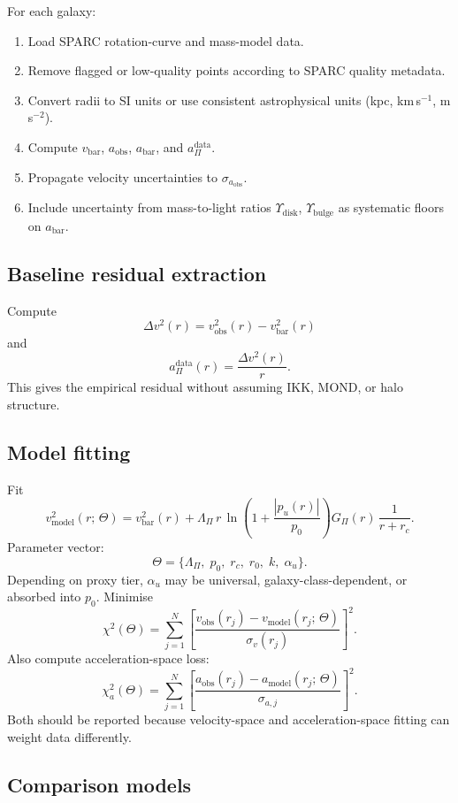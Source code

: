 \documentclass[11pt,a4paper,oneside]{article}
\newcommand{\aobs}{a_{\mathrm{obs}}}
\newcommand{\abar}{a_{\mathrm{bar}}}
\newcommand{\aPi}{a_{\Pi}}
\newcommand{\vobs}{v_{\mathrm{obs}}}
\newcommand{\vbar}{v_{\mathrm{bar}}}
\newcommand{\vmod}{v_{\mathrm{model}}}
\newcommand{\LamPi}{\Lambda_{\Pi}}
\newcommand{\pzero}{p_0}
\newcommand{\rc}{r_c}
\newcommand{\rzero}{r_0}
\newcommand{\pu}{p_u}
\newcommand{\GPi}{G_{\Pi}}
\newcommand{\Upsdisk}{\Upsilon_{\mathrm{disk}}}
\newcommand{\Upsbulge}{\Upsilon_{\mathrm{bulge}}}
\begin{document}
For each galaxy:
\begin{enumerate}
  \item Load SPARC rotation-curve and mass-model data.
  \item Remove flagged or low-quality points according to SPARC quality metadata.
  \item Convert radii to SI units or use consistent astrophysical units
        (kpc, km\,s$^{-1}$, m\,s$^{-2}$).
  \item Compute $\vbar$, $\aobs$, $\abar$, and $\aPi^{\mathrm{data}}$.
  \item Propagate velocity uncertainties to $\sigma_{\aobs}$.
  \item Include uncertainty from mass-to-light ratios $\Upsdisk$, $\Upsbulge$ as
        systematic floors on $\abar$.
\end{enumerate}

\subsection{Baseline residual extraction}

Compute
\[
    \Delta v^2(r) = \vobs^2(r) - \vbar^2(r)
\]
and
\[
    \aPi^{\mathrm{data}}(r) = \frac{\Delta v^2(r)}{r}.
\]
This gives the empirical residual without assuming IKK, MOND, or halo structure.

\subsection{Model fitting}

Fit
\[
    \vmod^2(r;\,\Theta) = \vbar^2(r)
    + \LamPi\,r\,\ln\!\left(1+\frac{|\pu(r)|}{\pzero}\right)
      \GPi(r)\,\frac{1}{r+\rc}.
\]
Parameter vector:
\[
    \Theta = \{\LamPi,\;\pzero,\;\rc,\;\rzero,\;k,\;\alpha_u\}.
\]
Depending on proxy tier, $\alpha_u$ may be universal, galaxy-class-dependent, or
absorbed into $\pzero$. Minimise
\[
    \chi^2(\Theta) = \sum_{j=1}^{N}
    \left[\frac{\vobs(r_j) - \vmod(r_j;\,\Theta)}{\sigma_v(r_j)}\right]^2.
\]
Also compute acceleration-space loss:
\[
    \chi^2_a(\Theta) = \sum_{j=1}^{N}
    \left[\frac{\aobs(r_j) - a_{\mathrm{model}}(r_j;\,\Theta)}{\sigma_{a,j}}\right]^2.
\]
Both should be reported because velocity-space and acceleration-space fitting can weight
data differently.

\subsection{Comparison models}
\end{document}
